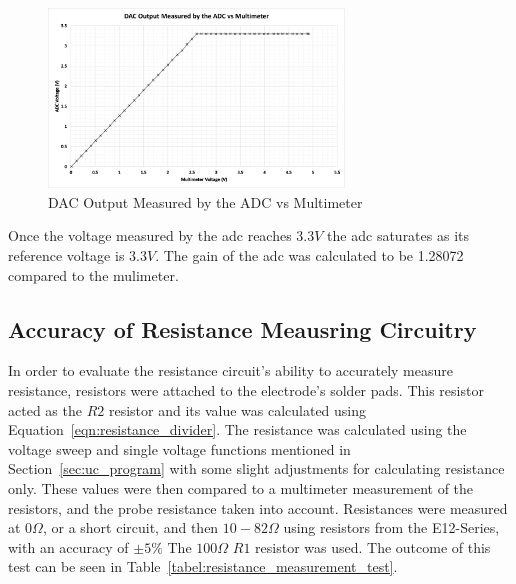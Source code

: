 \begin{figure}[H]\label{fig:adc_test}
    \centering
    \includegraphics[width=0.7\textwidth]{figures/adc_test.png}
    \caption{DAC Output Measured by the ADC vs Multimeter}
\end{figure}

Once the voltage measured by the \gls{adc} reaches $3.3V$ the \gls{adc} saturates as its reference voltage is $3.3V$.
The gain of the \gls{adc} was calculated to be 1.28072 compared to the mulimeter.

\subsection{Accuracy of Resistance Meausring Circuitry}
In order to evaluate the resistance circuit's ability to accurately measure resistance, resistors were attached to the electrode's solder pads.
This resistor acted as the $R2$ resistor and its value was calculated using Equation~\ref{eqn:resistance_divider}.
The resistance was calculated using the voltage sweep and single voltage functions mentioned in Section~\ref{sec:uc_program} with some slight adjustments for calculating resistance only.
These values were then compared to a multimeter measurement of the resistors, and the probe resistance taken into account.
Resistances were measured at $0\Omega$, or a short circuit, and then $10-82\Omega$ using resistors from the E12-Series, with an accuracy of $\pm5\%$
The $100\Omega$ $R1$ resistor was used.
The outcome of this test can be seen in Table~\ref{tabel:resistance_measurement_test}.


